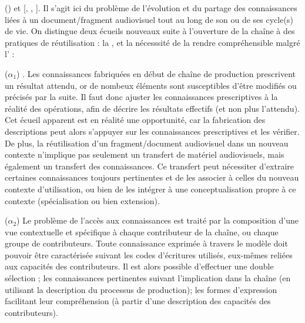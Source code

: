 \begin{liste}
 	\item[(\g{$\alpha$})] et  [, , ].
 	Il s'agit ici du problème de l'évolution et du partage des connaissances liées à un document/fragment audiovisuel tout au long de son ou de ses cycle(s) de vie. 
 	On distingue deux écueils nouveaux suite à l'ouverture de la chaîne à des pratiques de réutilisation : la , et la nécesssité de la rendre compréhensible malgré l' : 
 	\begin{listeni}
 		\item[($\alpha_1$)] .
 		Les connaissances fabriquées en début de chaîne de production prescrivent un résultat attendu, or de nombeux éléments sont susceptibles d'être modifiés ou précisés par la suite.
 		Il faut donc ajuster les connaissances prescriptives à la réalité des opérations, afin de décrire les résultats effectifs (et non plus l'attendu).
 		Cet écueil apparent est en réalité une opportunité, car la fabrication des descriptions peut alors s'appuyer sur les connaissances prescriptives et les vérifier. 
		De plus, la réutilisation d'un fragment/document audiovisuel dans un nouveau contexte n'implique pas seulement un transfert de matériel audiovisuels, mais également un transfert des connaissances. %
		Ce transfert peut nécessiter d'extraire certaines connaissances toujours pertinentes et de les associer à celles du nouveau contexte d'utilisation, ou bien de les intégrer à une conceptualisation propre à ce contexte (spécialisation ou bien extension).

		\item[($\alpha_2$)] 
 		Le problème de l'accès aux connaissances est traité par la composition d'une vue contextuelle et spécifique à chaque contributeur de la chaîne, ou chaque groupe de contributeurs.
 		Toute connaissance exprimée à travers le modèle doit pouvoir être caractérisée suivant les codes d'écritures utilisés, eux-mêmes reliées aux capacités des contributeurs.
		Il est alors possible d'effectuer une double sélection ; les connaissances pertinentes suivant l'implication dans la chaîne (en utilisant la description du processus de production); les formes d'expression facilitant leur compréhension (à partir d'une description des capacités des contributeurs).
 	\end{listeni}
\end{liste}



